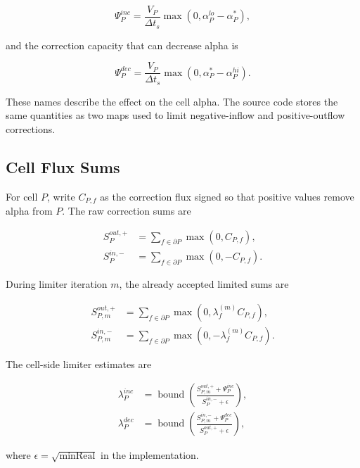 \documentclass[11pt]{article}
\newcommand{\bnd}{\operatorname{bound}}
\begin{document}
\begin{equation}
  \Psi_P^{inc}
  =
  \frac{V_P}{\Delta t_s}
  \max(0,\alpha_P^{lo}-\alpha_P^*),
  \label{eq:psi-inc}
\end{equation}

and the correction capacity that can decrease alpha is

\begin{equation}
  \Psi_P^{dec}
  =
  \frac{V_P}{\Delta t_s}
  \max(0,\alpha_P^*-\alpha_P^{hi}).
  \label{eq:psi-dec}
\end{equation}

These names describe the effect on the cell alpha.  The source code stores the
same quantities as two maps used to limit negative-inflow and positive-outflow
corrections.

\subsection{Cell Flux Sums}

For cell \(P\), write \(C_{P,f}\) as the correction flux signed so that positive
values remove alpha from \(P\).  The raw correction sums are

\begin{align}
  S_P^{out,+}
  &=
  \sum_{f\in\partial P}
  \max(0,C_{P,f}),
  \\
  S_P^{in,-}
  &=
  \sum_{f\in\partial P}
  \max(0,-C_{P,f}).
\end{align}

During limiter iteration \(m\), the already accepted limited sums are

\begin{align}
  S_{P,m}^{out,+}
  &=
  \sum_{f\in\partial P}
  \max(0,\lambda_f^{(m)}C_{P,f}),
  \\
  S_{P,m}^{in,-}
  &=
  \sum_{f\in\partial P}
  \max(0,-\lambda_f^{(m)}C_{P,f}).
\end{align}

The cell-side limiter estimates are

\begin{align}
  \lambda_P^{inc}
  &=
  \bnd
  \left(
    \frac{S_{P,m}^{out,+}+\Psi_P^{inc}}
         {S_P^{in,-}+\epsilon}
  \right),
  \\
  \lambda_P^{dec}
  &=
  \bnd
  \left(
    \frac{S_{P,m}^{in,-}+\Psi_P^{dec}}
         {S_P^{out,+}+\epsilon}
  \right),
  \label{eq:cell-limiters}
\end{align}

where \(\epsilon=\sqrt{\mathrm{minReal}}\) in the implementation.
\end{document}
